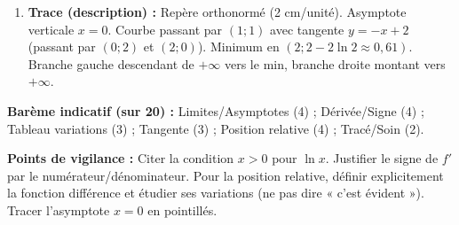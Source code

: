 \documentclass[11pt]{article}
\begin{document}
\begin{corrige}[Exercice 9 — Étude complète : $f(x) = x - 2\ln x$ (Type Probatoire C/E)]
\begin{enumerate}
    Posons $h(x) = x-1-\ln x$ sur $]0;+\infty[$.
    $h'(x) = 1 - \frac{1}{x} = \frac{x-1}{x}$.
    $h$ décroît sur $]0;1]$, croît sur $[1;+\infty[$. Minimum $h(1)=0$.
    Donc $\forall x>0,\; h(x) \ge 0 \implies \varphi(x) \ge 0 \implies f(x) \ge -x+2$.
    Égalité seulement en $x=1$.
    \textbf{Conclusion :} La courbe $\mathcal{C}_f$ se situe \textbf{au-dessus} de sa tangente $T$ en $1$ (contact en $x=1$).
    \item \textbf{Trace (description) :} Repère orthonormé (2 cm/unité). Asymptote verticale $x=0$. Courbe passant par $(1;1)$ avec tangente $y=-x+2$ (passant par $(0;2)$ et $(2;0)$). Minimum en $(2; 2-2\ln 2 \approx 0,61)$. Branche gauche descendant de $+\infty$ vers le min, branche droite montant vers $+\infty$.
\end{enumerate}
\par\medskip
\textbf{Barème indicatif (sur 20) :} Limites/Asymptotes (4) ; Dérivée/Signe (4) ; Tableau variations (3) ; Tangente (3) ; Position relative (4) ; Tracé/Soin (2).
\par\textbf{Points de vigilance :} Citer la condition $x>0$ pour $\ln x$. Justifier le signe de $f'$ par le numérateur/dénominateur. Pour la position relative, définir explicitement la fonction différence et étudier ses variations (ne pas dire « c'est évident »). Tracer l'asymptote $x=0$ en pointillés.
\end{corrige}
\end{document}
